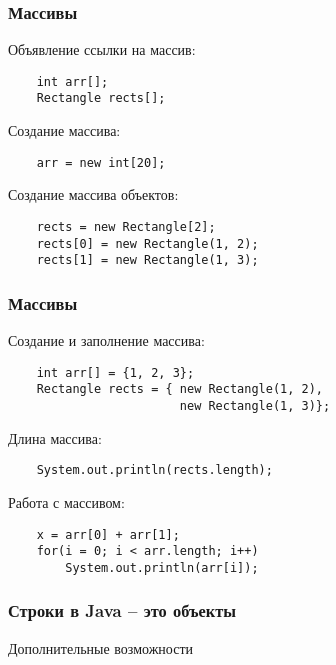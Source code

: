 \begin{frame}[fragile]
	\frametitle{Массивы}

	\begin{Large}
	Объявление ссылки на массив:
	\begin{verbatim}
	int arr[];
	Rectangle rects[];
	\end{verbatim}

	Создание массива:
	\begin{verbatim}
	arr = new int[20];
	\end{verbatim}

	Создание массива объектов:
	\begin{verbatim}
	rects = new Rectangle[2];
	rects[0] = new Rectangle(1, 2);
	rects[1] = new Rectangle(1, 3);
	\end{verbatim}
	\end{Large}
\end{frame}

\begin{frame}[fragile]
	\frametitle{Массивы}

	\begin{Large}
	Создание и заполнение массива:
	\begin{verbatim}
	int arr[] = {1, 2, 3};
	Rectangle rects = { new Rectangle(1, 2),
	                    new Rectangle(1, 3)};
	\end{verbatim}

	Длина массива:
	\begin{verbatim}
	System.out.println(rects.length);
	\end{verbatim}

	Работа с массивом:
	\begin{verbatim}
	x = arr[0] + arr[1];
	for(i = 0; i < arr.length; i++)
	    System.out.println(arr[i]);
	\end{verbatim}

	\end{Large}
\end{frame}

\begin{frame}[fragile]
	\frametitle{Строки в Java -- это объекты}

	Дополнительные возможности
\end{frame}

